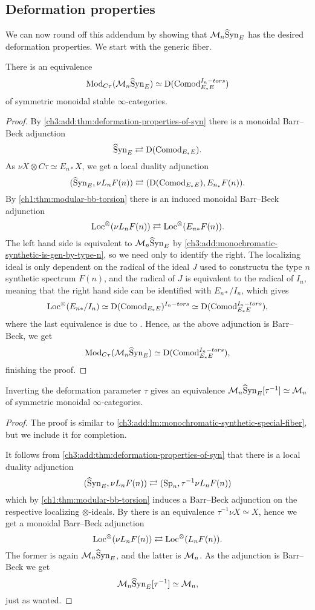 \subsection{Deformation properties}

We can now round off this addendum by showing that $\mathcal{M}_{n}\widehat{\mathrm{S}}\mathrm{yn}_{E}$ has the desired deformation properties. We start with the generic fiber. 

\begin{lemma}
    \label{ch3:add:lm:monochromatic-synthetic-special-fiber}
    There is an equivalence
    \[\mathrm{Mod}_{C\tau}(\mathcal{M}_{n}\widehat{\mathrm{S}}\mathrm{yn}_{E}) \simeq \mathrm{D}(\mathrm{Comod}_{E_*E}^{I_n-tors})\]
    of symmetric monoidal stable $\infty$-categories. 
\end{lemma}
\begin{proof}
    By \cref{ch3:add:thm:deformation-properties-of-syn} there is a monoidal Barr--Beck adjunction 
    \[\widehat{\mathrm{S}}\mathrm{yn}_{E} \rightleftarrows \mathrm{D}(\mathrm{Comod}_{E_*E}).\]
    As $\nu X \otimes C\tau \simeq E_{n*} X$, we get a local duality adjunction 
    \[(\widehat{\mathrm{S}}\mathrm{yn}_{E}, \nu L_n F(n))\rightleftarrows (\mathrm{D}(\mathrm{Comod}_{E_*E}), E_{n_*}F(n)).\]
    By \cref{ch1:thm:modular-bb-torsion} there is an induced monoidal Barr--Beck adjunction 
    \[\operatorname{Loc}^\otimes(\nu L_n F(n))\rightleftarrows \operatorname{Loc}^\otimes(E_{n*}F(n)).\]
    The left hand side is equivalent to $\mathcal{M}_{n}\widehat{\mathrm{S}}\mathrm{yn}_{E}$ by \cref{ch3:add:monochromatic-synthetic-is-gen-by-type-n}, so we need only to identify the right. The localizing ideal is only dependent on the radical of the ideal $J$ used to constructu the type $n$ synthetic spectrum $F(n)$, and the radical of $J$ is equivalent to the radical of $I_n$, meaning that the right hand side can be identified with $E_{n*}/I_n$, which gives 
    \[\operatorname{Loc}^\otimes(E_{n*}/I_n) \simeq \mathrm{D}(\mathrm{Comod}_{E_*E})^{I_n-tors}\simeq \mathrm{D}(\mathrm{Comod}_{E_*E}^{I_n-tors}),\]
    where the last equivalence is due to \cite[3.7(2)]{barthel-heard-valenzuela_2020}. Hence, as the above adjunction is Barr--Beck, we get 
    \[\mathrm{Mod}_{C\tau}(\mathcal{M}_{n}\widehat{\mathrm{S}}\mathrm{yn}_{E}) \simeq \mathrm{D}(\mathrm{Comod}_{E_*E}^{I_n-tors}),\]
    finishing the proof. 
\end{proof}

\begin{lemma}
    Inverting the deformation parameter $\tau$ gives an equivalence $\mathcal{M}_{n}\widehat{\mathrm{S}}\mathrm{yn}_{E}[\tau^{-1}] \simeq \mathcal{M}_{n}$ of symmetric monoidal $\infty$-categories. 
\end{lemma}
\begin{proof}
    The proof is similar to \cref{ch3:add:lm:monochromatic-synthetic-special-fiber}, but we include it for completion. 

    It follows from \cref{ch3:add:thm:deformation-properties-of-syn} that there is a local duality adjunction 
    \[(\widehat{\mathrm{S}}\mathrm{yn}_{E}, \nu L_n F(n)) \rightleftarrows (\mathrm{Sp}_n, \tau^{-1}\nu L_n F(n))\]
    which by \cref{ch1:thm:modular-bb-torsion} induces a Barr--Beck adjunction on the respective localizing $\otimes$-ideals. By \citeme there is an equivalence $\tau^{-1}\nu X \simeq X$, hence we get a monoidal Barr--Beck adjunction 
    \[\operatorname{Loc}^\otimes(\nu L_n F(n))\rightleftarrows \operatorname{Loc}^\otimes(L_n F(n)).\]
    The former is again $\mathcal{M}_{n}\widehat{\mathrm{S}}\mathrm{yn}_{E}$, and the latter is $\mathcal{M}_{n}$. As the adjunction is Barr--Beck we get 
    \[\mathcal{M}_{n}\widehat{\mathrm{S}}\mathrm{yn}_{E}[\tau^{-1}]\simeq \mathcal{M}_{n},\]
    just as wanted. 
\end{proof}






